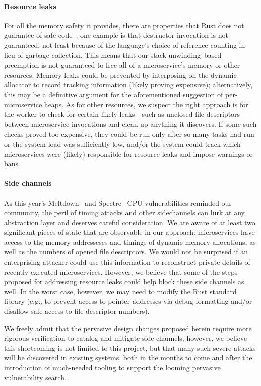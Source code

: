 \paragraph{Resource leaks}
For all the memory safety it provides, there are properties that Rust does not
guarantee of safe code~\cite{www-rustlang-nu}; one example is that destructor
invocation is not guaranteed, not least because of the language's choice of reference
counting in lieu of garbage collection.  This means that our stack unwinding--based
preemption is not guaranteed to free all of a microservice's memory or other
resources.  Memory leaks could be prevented by interposing on the dynamic allocator
to record tracking information (likely proving expensive); alternatively, this may be
a definitive argument for the aforementioned suggestion of per-microservice heaps.
As for other resources, we suspect the right approach is for the worker to check for
certain likely leaks---such as unclosed file descriptors---between microservice
invocations and clean up anything it discovers.  If some such checks proved too
expensive, they could be run only after so many tasks had run or the system load was
sufficiently low, and/or the system could track which microservices were (likely)
responsible for resource leaks and impose warnings or bans.

\paragraph{Side channels}
As this year's Meltdown~\cite{Lipp2018} and Spectre~\cite{Kocher2018} CPU
vulnerabilities reminded our community, the peril of timing attacks and other
sidechannels can lurk at any abstraction layer and deserves careful consideration.
We are aware of at least two significant pieces of state that are observable in our
approach: microservices have access to the memory addresseses and timings of dynamic
memory allocations, as well as the numbers of opened file descriptors.  We would not
be surprised if an enterprising attacker could use this information to reconstruct
private details of recently-executed microservices.  However, we believe that some of
the steps proposed for addressing resource leaks could help block these side
channels as well.  In the worst case, however, we may need to modify the Rust
standard library (e.g., to prevent access to pointer addresses via debug formatting
and/or disallow safe access to file descriptor numbers).

We freely admit that the pervasive design changes proposed herein require more
rigorous verification to catalog and mitigate side-channels; however, we believe this
shortcoming is not limited to this project, but that many such severe attacks will be
discovered in existing systems, both in the months to come and after the introduction
of much-needed tooling to support the looming pervasive vulnerability search.

